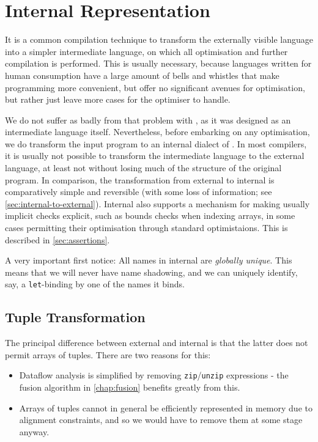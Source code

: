 \chapter{Internal Representation}
\label{chap:internal}

It is a common compilation technique to transform the externally
visible language into a simpler intermediate language, on which all
optimisation and further compilation is performed.  This is usually
necessary, because languages written for human consumption have a
large amount of bells and whistles that make programming more
convenient, but offer no significant avenues for optimisation, but
rather just leave more cases for the optimiser to handle.

We do not suffer as badly from that problem with \LO{}, as it was
designed as an intermediate language itself.  Nevertheless, before
embarking on any optimisation, we do transform the input program to an
internal dialect of \LO{}.  In most compilers, it is usually not
possible to transform the intermediate language to the external
language, at least not without losing much of the structure of the
original program.  In comparison, the transformation from external to
internal \LO{} is comparatively simple and reversible (with some loss
of information; see \cref{sec:internal-to-external}).  Internal \LO{}
also supports a mechanism for making usually implicit checks explicit,
such as bounds checks when indexing arrays, in some cases permitting
their optimisation through standard optimistaions.  This is described
in \cref{sec:assertions}.

A very important first notice: All names in internal \LO{} are
\textit{globally unique}.  This means that we will never have name
shadowing, and we can uniquely identify, say, a \texttt{let}-binding
by one of the names it binds.

\section{Tuple Transformation}
\label{sec:tuple-transformation}

The principal difference between external and internal \LO{} is that
the latter does not permit arrays of tuples.  There are two reasons
for this:
\begin{itemize}
\item Dataflow analysis is simplified by removing
  \texttt{zip}/\texttt{unzip} expressions - the fusion algorithm in
  \cref{chap:fusion} benefits greatly from this.

\item Arrays of tuples cannot in general be efficiently represented in
  memory due to alignment constraints, and so we would have to remove
  them at some stage anyway.
\end{itemize}

